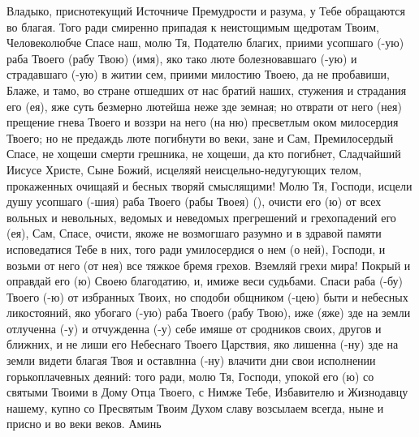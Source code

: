 \begin{mymulticols}
Владыко, приснотекущий Источниче Премудрости и разума, у Тебе обращаются во благая. Того ради смиренно припадая к неистощимым щедротам Твоим, Человеколюбче Спасе наш, молю Тя, Подателю благих, приими усопшаго (-ую) раба Твоего (рабу Твою) (имя), яко тако люте болезновавшаго (-ую) и страдавшаго (-ую) в житии сем, приими милостию Твоею, да не пробавиши, Блаже, и тамо, во стране отшедших от нас братий наших, стужения и страдания его (ея), яже суть безмерно лютейша неже зде земная; но отврати от него (нея) прещение гнева Твоего и воззри на него (на ню) пресветлым оком милосердия Твоего; но не предаждь люте погибнути во веки, зане и Сам, Премилосердый Спасе, не хощеши смерти грешника, не хощеши, да кто погибнет, Сладчайший Иисусе Христе, Сыне Божий, исцеляяй неисцельно-недугующих телом, прокаженных очищаяй и бесных творяй смыслящими! Молю Тя, Господи, исцели душу усопшаго (-шия) раба Твоего (рабы Твоея) (), очисти его (ю) от всех вольных и невольных, ведомых и неведомых прегрешений и грехопадений его (ея), Сам, Спасе, очисти, якоже не возмогшаго разумно и в здравой памяти исповедатися Тебе в них, того ради умилосердися о нем (о ней), Господи, и возьми от него (от нея) все тяжкое бремя грехов. Вземляй грехи мира! Покрый и оправдай его (ю) Своею благодатию, и, имиже веси судьбами. Спаси раба (-бу) Твоего (-ю) от избранных Твоих, но сподоби общником (-цею) быти и небесных ликостояний, яко убогаго (-ую) раба Твоего (рабу Твою), иже (яже) зде на земли отлученна (-у) и отчужденна (-у) себе имяше от сродников своих, другов и ближних, и не лиши его Небеснаго Твоего Царствия, яко лишенна (-ну) зде на земли видети благая Твоя и оставлнна (-ну) влачити дни свои исполнении горькоплачевных деяний: того ради, молю Тя, Господи, упокой его (ю) со святыми Твоими в Дому Отца Твоего, с Нимже Тебе, Избавителю и Жизнодавцу нашему, купно со Пресвятым Твоим Духом славу возсылаем всегда, ныне и присно и во веки веков. Аминь

\end{mymulticols}

\mychapterending

